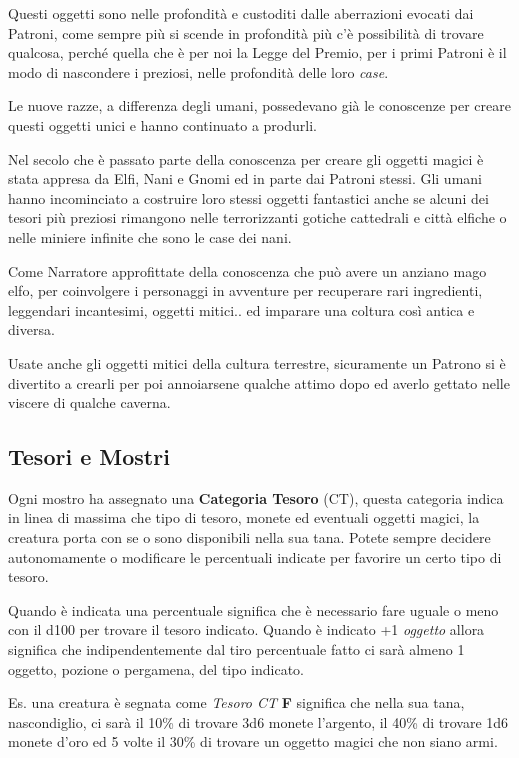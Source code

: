 \begin{multicols}{2}
Questi oggetti sono nelle profondità e custoditi dalle aberrazioni evocati dai Patroni, come sempre più si scende in profondità più c'è possibilità di trovare qualcosa, perché quella che è per noi la Legge del Premio, per i primi Patroni è il modo di nascondere i preziosi, nelle profondità delle loro \emph{case}.

Le nuove razze, a differenza degli umani, possedevano già le conoscenze per creare questi oggetti unici e hanno continuato a produrli.

Nel secolo che è passato parte della conoscenza per creare gli oggetti magici è stata appresa da Elfi, Nani e Gnomi ed in parte dai Patroni stessi. Gli umani hanno incominciato a costruire loro stessi oggetti fantastici anche se alcuni dei tesori più preziosi rimangono nelle terrorizzanti gotiche cattedrali e città elfiche o nelle miniere infinite che sono le case dei nani.

Come Narratore approfittate della conoscenza che può avere un anziano mago elfo, per coinvolgere i personaggi in avventure per recuperare rari ingredienti, leggendari incantesimi, oggetti mitici.. ed imparare una coltura così antica e diversa.

Usate anche gli oggetti mitici della cultura terrestre, sicuramente un Patrono si è divertito a crearli per poi annoiarsene qualche attimo dopo ed averlo gettato nelle viscere di qualche caverna.

\subsection{Tesori e Mostri}

Ogni mostro ha assegnato una \textbf{Categoria Tesoro} (CT), questa categoria indica in linea di massima che tipo di tesoro, monete ed eventuali oggetti magici, la creatura porta con se o sono disponibili nella sua tana. Potete sempre decidere autonomamente o modificare le percentuali indicate per favorire un certo tipo di tesoro.

Quando è indicata una percentuale significa che è necessario fare uguale o meno con il d100 per trovare il tesoro indicato. Quando è indicato +1 \emph{oggetto} allora significa che indipendentemente dal tiro percentuale fatto ci sarà almeno 1 oggetto, pozione o pergamena, del tipo indicato.

Es. una creatura è segnata come \emph{Tesoro CT} \textbf{F} significa che nella sua tana, nascondiglio, ci sarà il 10\% di trovare 3d6 monete l'argento, il 40\% di trovare 1d6 monete d'oro ed 5 volte il 30\% di trovare un oggetto magici che non siano armi.


\end{multicols}

